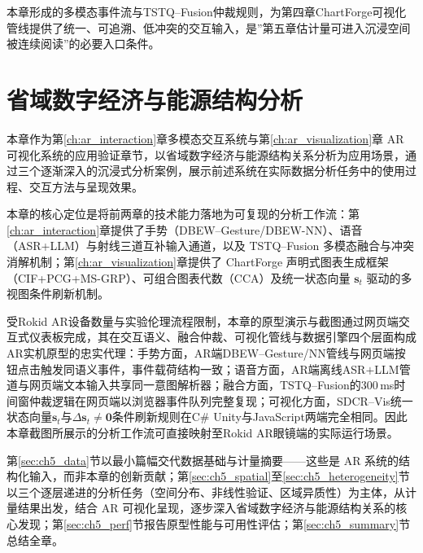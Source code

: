 本章形成的多模态事件流与TSTQ--Fusion仲裁规则，为第四章ChartForge可视化管线提供了统一、可追溯、低冲突的交互输入，是”第五章估计量可进入沉浸空间被连续阅读”的必要入口条件。

\newtheorem{definition}{定义}
\newtheorem{theorem}{定理}
\newtheorem{proposition}{命题}
\makeatletter
\newenvironment{proof}[1][\proofname]{\par\noindent\textbf{#1：}}{\hfill$\square$\par}
\makeatother



\chapter{省域数字经济与能源结构分析}
\label{ch:empirical_de_es}

本章作为第\ref{ch:ar_interaction}章多模态交互系统与第\ref{ch:ar_visualization}章 AR 可视化系统的应用验证章节，以省域数字经济与能源结构关系分析为应用场景，通过三个逐渐深入的沉浸式分析案例，展示前述系统在实际数据分析任务中的使用过程、交互方法与呈现效果。

本章的核心定位是将前两章的技术能力落地为可复现的分析工作流：第\ref{ch:ar_interaction}章提供了手势（DBEW--Gesture/DBEW-NN）、语音（ASR+LLM）与射线三道互补输入通道，以及 TSTQ--Fusion 多模态融合与冲突消解机制；第\ref{ch:ar_visualization}章提供了 ChartForge 声明式图表生成框架（CIF+PCG+MS-GRP）、可组合图表代数（CCA）及统一状态向量 $\mathbf{s}_t$ 驱动的多视图条件刷新机制。

受Rokid AR设备数量与实验伦理流程限制，本章的原型演示与截图通过网页端交互式仪表板完成，其在交互语义、融合仲裁、可视化管线与数据引擎四个层面构成AR实机原型的忠实代理：手势方面，AR端DBEW--Gesture/NN管线与网页端按钮点击触发同语义事件，事件载荷结构一致；语音方面，AR端离线ASR$+$LLM管道与网页端文本输入共享同一意图解析器；融合方面，TSTQ--Fusion的300\,ms时间窗仲裁逻辑在网页端以浏览器事件队列完整复现；可视化方面，SDCR--Vis统一状态向量$\mathbf{s}_t$与$\Delta\mathbf{s}_t\neq\mathbf{0}$条件刷新规则在C\# Unity与JavaScript两端完全相同。因此本章截图所展示的分析工作流可直接映射至Rokid AR眼镜端的实际运行场景。

第\ref{sec:ch5_data}节以最小篇幅交代数据基础与计量摘要——这些是 AR 系统的结构化输入，而非本章的创新贡献；第\ref{sec:ch5_spatial}至\ref{sec:ch5_heterogeneity}节以三个逐层递进的分析任务（空间分布、非线性验证、区域异质性）为主体，从计量结果出发，结合 AR 可视化呈现，逐步深入省域数字经济与能源结构关系的核心发现；第\ref{sec:ch5_perf}节报告原型性能与可用性评估；第\ref{sec:ch5_summary}节总结全章。


